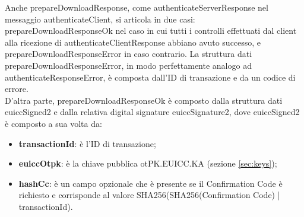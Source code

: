 \documentclass[10pt, oneside]{book}
\begin{document}
Anche prepareDownloadResponse, come authenticateServerResponse nel messaggio authenticateClient, si articola in due casi: prepareDownloadResponseOk nel caso in cui tutti i controlli effettuati dal client alla ricezione di authenticateClientResponse abbiano avuto successo, e prepareDownloadResponseError in caso contrario. La struttura dati prepareDownloadResponseError, in modo perfettamente analogo ad authenticateResponseError, è composta dall'ID di transazione e da un codice di errore.\\
D'altra parte, prepareDownloadResponseOk è composto dalla struttura dati euiccSigned2 e dalla relativa digital signature euiccSignature2, dove euiccSigned2 è composto a sua volta da:
\begin{itemize}
\item \textbf{transactionId}: è l'ID di transazione;
\item \textbf{euiccOtpk}: è la chiave pubblica otPK.EUICC.KA (sezione \ref{sec:keys});
\item \textbf{hashCc}: è un campo opzionale che è presente se il Confirmation Code è richiesto e corrisponde al valore SHA256(SHA256(Confirmation Code) | transactionId).
\end{itemize}
\end{document}
